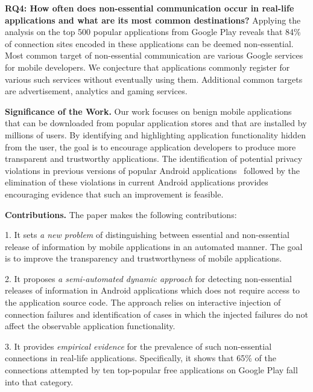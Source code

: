 \vspace{0.1in}
\noindent 
{\bf RQ4: How often does non-essential communication occur in real-life applications and what are its most common destinations?}
Applying the analysis on the top 500 popular applications from Google Play reveals that 84\% of connection sites encoded in these applications can be deemed non-essential.
Most common target of non-essential communication are various Google services for mobile developers. We conjecture 
that applications commonly register for various such services without eventually using them. 
Additional common targets are advertisement, analytics and gaming services. 

\vspace{0.1in}
\noindent 
{\bf Significance of the Work.}  Our work focuses on benign mobile
applications that can be downloaded from popular application stores
and that are installed by millions of users.  By identifying and
highlighting application functionality hidden from the user, the goal
is to encourage application developers to produce more transparent and
trustworthy applications. The identification of potential privacy
violations in previous versions of popular Android
applications~\cite{Enck:Gilbert:Chun:Cox:Jung:McDaniel:Sheth:OSDI10,Egele:Kruegel:Kirda:Vign:NDSS11,Tripp:Rubin:SEC14} followed by the
elimination of these violations in current Android applications
provides encouraging evidence that such an improvement is feasible.

\vspace{0.1in}
\noindent 
{\bf Contributions.}
The paper makes the following contributions:

1.
It sets \emph{a new problem} of distinguishing between essential and non-essential release of information by mobile applications in an automated manner. The goal is to improve the
transparency and trustworthyness of mobile applications.

\vspace{0.05in}
2.
It proposes \emph{a semi-automated dynamic approach} for detecting non-essential releases of information in Android applications which does not require access to the application source code. 
The approach relies on interactive injection of connection failures and identification of cases in which the injected failures do not affect the observable application functionality. 

\vspace{0.05in}
3.
It provides \emph{empirical evidence} for the prevalence of such non-essential connections in real-life applications. Specifically, it shows that 65\% of the connections attempted by ten top-popular free applications on Google Play fall into that category.    

